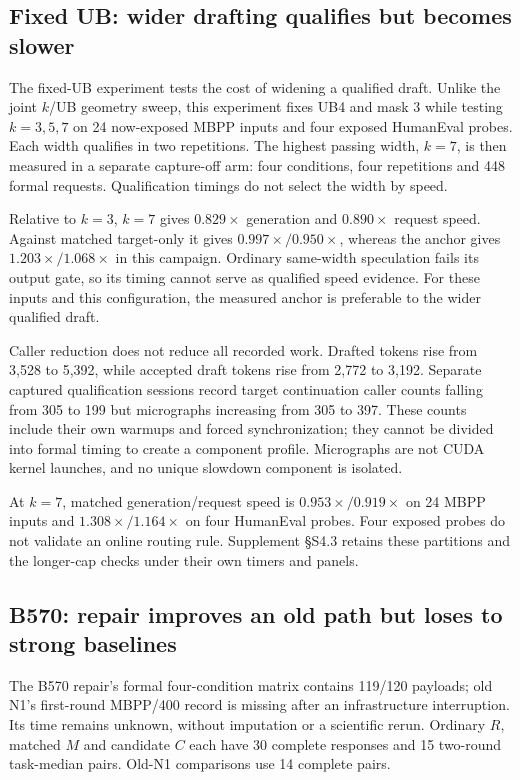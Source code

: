 \subsection{Fixed UB: wider drafting qualifies but becomes slower}
The fixed-UB experiment tests the cost of widening a qualified draft. Unlike the joint $k$/UB geometry sweep, this experiment fixes UB4 and mask 3 while testing $k=3,5,7$ on 24 now-exposed MBPP inputs and four exposed HumanEval probes. Each width qualifies in two repetitions. The highest passing width, $k=7$, is then measured in a separate capture-off arm: four conditions, four repetitions and 448 formal requests. Qualification timings do not select the width by speed.

Relative to $k=3$, $k=7$ gives $0.829\times$ generation and $0.890\times$ request speed. Against matched target-only it gives $0.997\times/0.950\times$, whereas the anchor gives $1.203\times/1.068\times$ in this campaign. Ordinary same-width speculation fails its output gate, so its timing cannot serve as qualified speed evidence. For these inputs and this configuration, the measured anchor is preferable to the wider qualified draft.

Caller reduction does not reduce all recorded work. Drafted tokens rise from 3,528 to 5,392, while accepted draft tokens rise from 2,772 to 3,192. Separate captured qualification sessions record target continuation caller counts falling from 305 to 199 but micrographs increasing from 305 to 397. These counts include their own warmups and forced synchronization; they cannot be divided into formal timing to create a component profile. Micrographs are not CUDA kernel launches, and no unique slowdown component is isolated.

At $k=7$, matched generation/request speed is $0.953\times/0.919\times$ on 24 MBPP inputs and $1.308\times/1.164\times$ on four HumanEval probes. Four exposed probes do not validate an online routing rule. Supplement \S S4.3 retains these partitions and the longer-cap checks under their own timers and panels.

\subsection{B570: repair improves an old path but loses to strong baselines}
The B570 repair's formal four-condition matrix contains 119/120 payloads; old N1's first-round MBPP/400 record is missing after an infrastructure interruption. Its time remains unknown, without imputation or a scientific rerun. Ordinary $R$, matched $M$ and candidate $C$ each have 30 complete responses and 15 two-round task-median pairs. Old-N1 comparisons use 14 complete pairs.

